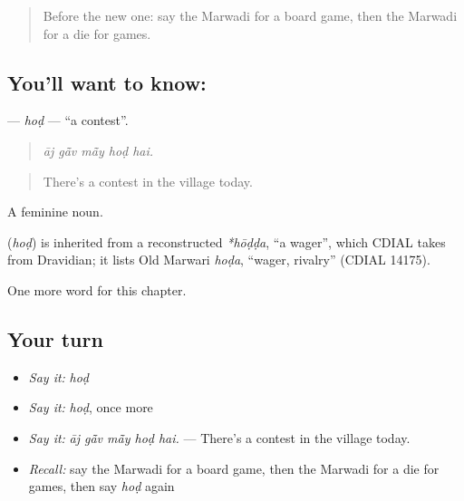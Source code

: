\begin{quote}
Before the new one: say the Marwadi for a board game, then the Marwadi for a die for games.
\end{quote}

\subsection*{You'll want to know: }
\textbf{} — \emph{hoḍ} — \textquotedblleft{}a contest\textquotedblright{}.

\begin{quote}
    
\end{quote}

\begin{quote}
\emph{āj gā̃v mā̃y hoḍ hai.}
\end{quote}

\begin{quote}
There's a contest in the village today.
\end{quote}

A feminine noun.

\begin{cousinweb}
\textbf{} (\emph{hoḍ}) is inherited from a reconstructed \emph{*hōḍḍa}, \textquotedblleft{}a wager\textquotedblright{}, which CDIAL takes from Dravidian; it lists Old Marwari \emph{hoḍa}, \textquotedblleft{}wager, rivalry\textquotedblright{} (CDIAL 14175).
\end{cousinweb}

\begin{grammarlens}[title={What you've built}]
One more word for this chapter.
\end{grammarlens}

\subsection*{Your turn}
\begin{itemize}
\raggedright
  \item \emph{Say it:} \emph{hoḍ}
  \item \emph{Say it:} \emph{hoḍ}, once more
  \item \emph{Say it:} \emph{āj gā̃v mā̃y hoḍ hai.} — There's a contest in the village today.
  \item \emph{Recall:} say the Marwadi for a board game, then the Marwadi for a die for games, then say \emph{hoḍ} again
\end{itemize}

